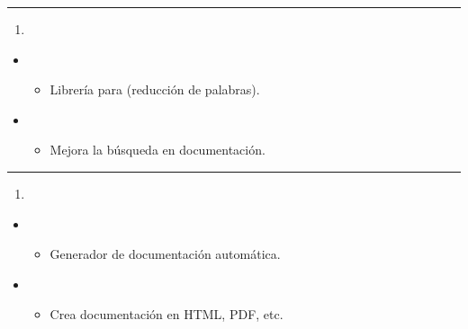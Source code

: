 \documentclass[a4paper,10pt,oneside,spanish,openany]{sphinxmanual}
\begin{document}
\bigskip\hrule\bigskip

\begin{enumerate}
%
\setcounter{enumi}{28}
\item {} 
\sphinxAtStartPar
{}

\end{enumerate}
\begin{itemize}
\item {} 
\sphinxAtStartPar
{}
\begin{itemize}
\item {} 
\sphinxAtStartPar
Librería para  (reducción de palabras).

\end{itemize}

\item {} 
\sphinxAtStartPar
{}
\begin{itemize}
\item {} 
\sphinxAtStartPar
Mejora la búsqueda en documentación.

\end{itemize}

\end{itemize}


\bigskip\hrule\bigskip

\begin{enumerate}
%
\setcounter{enumi}{29}
\item {} 
\sphinxAtStartPar
{}

\end{enumerate}
\begin{itemize}
\item {} 
\sphinxAtStartPar
{}
\begin{itemize}
\item {} 
\sphinxAtStartPar
Generador de documentación automática.

\end{itemize}

\item {} 
\sphinxAtStartPar
{}
\begin{itemize}
\item {} 
\sphinxAtStartPar
Crea documentación en HTML, PDF, etc.

\end{itemize}

\end{itemize}
\end{document}
